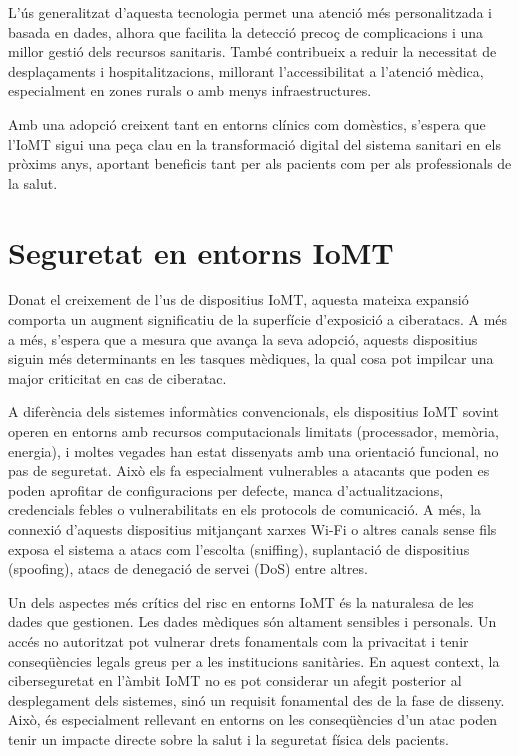   L’ús generalitzat d’aquesta tecnologia permet una atenció més personalitzada i basada en dades, alhora que facilita la detecció precoç de complicacions i una millor gestió dels recursos sanitaris. També contribueix a reduir la necessitat de desplaçaments i hospitalitzacions, millorant l’accessibilitat a l’atenció mèdica, especialment en zones rurals o amb menys infraestructures.
  
  Amb una adopció creixent tant en entorns clínics com domèstics, s’espera que l’IoMT sigui una peça clau en la transformació digital del sistema sanitari en els pròxims anys, aportant beneficis tant per als pacients com per als professionals de la salut. \cite{IoMTexp}

  \section{Seguretat en entorns IoMT}

  Donat el creixement de l'us de dispositius IoMT, aquesta mateixa expansió comporta un augment significatiu de la superfície d’exposició a ciberatacs. A més a més, s’espera que a mesura que avança la seva adopció, aquests dispositius siguin més determinants en les tasques mèdiques, la qual cosa pot impilcar una major criticitat en cas de ciberatac.

  A diferència dels sistemes informàtics convencionals, els dispositius IoMT sovint operen en entorns amb recursos computacionals limitats (processador, memòria, energia), i moltes vegades han estat dissenyats amb una orientació funcional, no pas de seguretat. Això els fa especialment vulnerables a atacants que poden es poden aprofitar de configuracions per defecte, manca d’actualitzacions, credencials febles o vulnerabilitats en els protocols de comunicació. A més, la connexió d’aquests dispositius mitjançant xarxes Wi-Fi o altres canals sense fils exposa el sistema a atacs com l’escolta (sniffing), suplantació de dispositius (spoofing), atacs de denegació de servei (DoS) entre altres.
  
  Un dels aspectes més crítics del risc en entorns IoMT és la naturalesa de les dades que gestionen. Les dades mèdiques són altament sensibles i personals. Un accés no autoritzat pot vulnerar drets fonamentals com la privacitat i tenir conseqüències legals greus per a les institucions sanitàries. En aquest context, la ciberseguretat en l’àmbit IoMT no es pot considerar un afegit posterior al desplegament dels sistemes, sinó un requisit fonamental des de la fase de disseny. Això, és especialment rellevant en entorns on les conseqüències d’un atac poden tenir un impacte directe sobre la salut i la seguretat física dels pacients.

